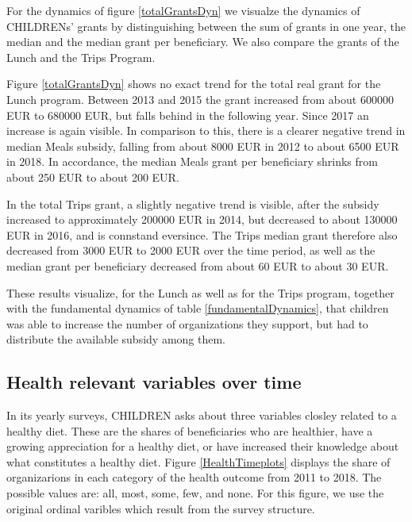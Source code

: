 \documentclass[12pt, a4paper, titlepage]{article}\usepackage[]{graphicx}\usepackage[]{color}
\begin{document}
For the dynamics of figure \ref{totalGrantsDyn} we visualze the dynamics of CHILDRENs' grants by distinguishing between the sum of grants in one year, the median and the median grant per beneficiary. We also compare the grants of the Lunch and the Trips Program.

Figure \ref{totalGrantsDyn} shows no exact trend for the total real grant for the Lunch program. Between 2013 and 2015 the grant increased from about 600000 EUR to 680000 EUR, but falls behind in the following year. Since 2017 an increase is again visible. In comparison to this, there is a clearer negative trend in median Meals subsidy, falling from about 8000 EUR in 2012 to about 6500 EUR in 2018. In accordance, the median Meals grant per beneficiary shrinks from about 250 EUR to about 200 EUR. 

In the total Trips grant, a slightly negative trend is visible, after the subsidy increased to approximately 200000 EUR in 2014, but decreased to about 130000 EUR in 2016, and is connstand eversince. The Trips median grant therefore also decreased from 3000 EUR to 2000 EUR over the time period, as well as the median grant per beneficiary decreased from about 60 EUR to about 30 EUR.

These results visualize, for the Lunch as well as for the Trips program, together with the fundamental dynamics of table \ref{fundamentalDynamics}, that children was able to increase the number of organizations they support, but had to distribute the available subsidy among them. 

\subsection{Health relevant variables over time} 

In its yearly surveys, CHILDREN asks about three variables closley related to a healthy diet. These are the shares of beneficiaries who are healthier, have a growing appreciation for a healthy diet, or have increased their knowledge about what constitutes a healthy diet. Figure \ref{HealthTimeplots} displays the share of organizarions in each category of the health outcome from 2011 to 2018. The possible values are: all, most, some, few, and none. For this figure, we use the original ordinal varibles which result from the survey structure.  
\end{document}
